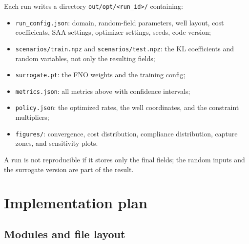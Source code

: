\documentclass[11pt]{article}
\numberwithin{equation}{section}
\theoremstyle{plain}
\begin{document}
Each run writes a directory \texttt{out/opt/<run\_id>/} containing:
\begin{itemize}[leftmargin=1.6em,itemsep=2pt]
  \item \texttt{run\_config.json}: domain, random-field parameters, well
        layout, cost coefficients, SAA settings, optimizer settings, seeds,
        code version;
  \item \texttt{scenarios/train.npz} and \texttt{scenarios/test.npz}: the KL
        coefficients and random variables, not only the resulting fields;
  \item \texttt{surrogate.pt}: the FNO weights and the training config;
  \item \texttt{metrics.json}: all metrics above with confidence intervals;
  \item \texttt{policy.json}: the optimized rates, the well coordinates, and
        the constraint multipliers;
  \item \texttt{figures/}: convergence, cost distribution, compliance
        distribution, capture zones, and sensitivity plots.
\end{itemize}
A run is not reproducible if it stores only the final fields; the random
inputs and the surrogate version are part of the result.

\section{Implementation plan}
\label{sec:implementation}

\subsection{Modules and file layout}
\end{document}
